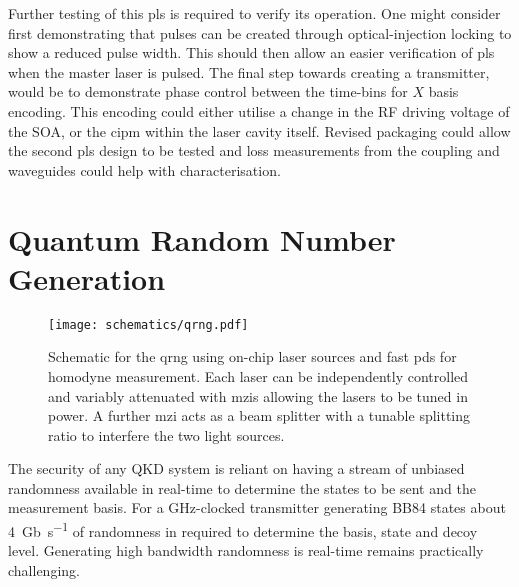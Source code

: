Further testing of this \ac{pls} is required to verify its operation. One might consider first demonstrating that pulses can be created through optical-injection locking \cite{Seo1996, Gunning1996} to show a reduced pulse width. This should then allow an easier verification of \ac{pls} when the master laser is pulsed. The final step towards creating a transmitter, would be to demonstrate phase control between the time-bins for $X$ basis encoding. This encoding could either utilise a change in the RF driving voltage of the \ac{SOA}, or the \ac{cipm} within the laser cavity itself. Revised packaging could allow the second \ac{pls} design to be tested and loss measurements from the coupling and waveguides could help with characterisation.



\section{Quantum Random Number Generation}
\label{sec:hhi_qrng}

\begin{figure}[tp]
	\centering
	\texttt{[image: schematics/qrng.pdf]}
	\caption[Schematic for InP quantum random number generator]{Schematic for the \acs{qrng} using on-chip laser sources and fast \acsp{pd} for homodyne measurement. Each laser can be independently controlled and variably attenuated with \acsp{mzi} allowing the lasers to be tuned in power. A further \acs{mzi} acts as a beam splitter with a tunable splitting ratio to interfere the two light sources.}
	\label{fig:qrng}
\end{figure}

The security of any \ac{QKD} system is reliant on having a stream of unbiased randomness available in real-time to determine the states to be sent and the measurement basis. For a \si{\GHz}-clocked transmitter generating BB84 states about \SI{4}{Gb\per\second} of randomness in required to determine the basis, state and decoy level. Generating high bandwidth randomness is real-time remains practically challenging.

